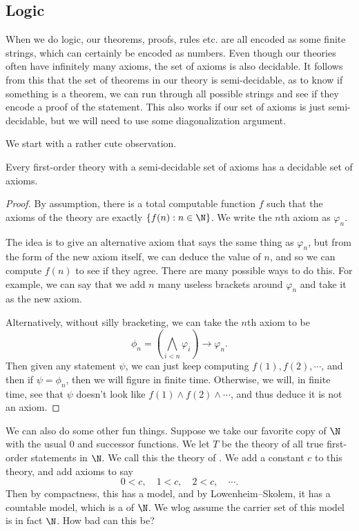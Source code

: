 \documentclass[a4paper]{article}
\begin{document}
\subsection{Logic}
When we do logic, our theorems, proofs, rules etc. are all encoded as some finite strings, which can certainly be encoded as numbers. Even though our theories often have infinitely many axioms, the set of axioms is also decidable. It follows from this that the set of theorems in our theory is semi-decidable, as to know if something is a theorem, we can run through all possible strings and see if they encode a proof of the statement. This also works if our set of axioms is just semi-decidable, but we will need to use some diagonalization argument.

We start with a rather cute observation.
\begin{thm}
  Every first-order theory with a semi-decidable set of axioms has a decidable set of axioms.
\end{thm}

\begin{proof}
  By assumption, there is a total computable function $f$ such that the axioms of the theory are exactly $\{f(n): n \in \N\}$. We write the $n$th axiom as $\varphi_n$.

  The idea is to give an alternative axiom that says the same thing as $\varphi_n$, but from the form of the new axiom itself, we can deduce the value of $n$, and so we can compute $f(n)$ to see if they agree. There are many possible ways to do this. For example, we can say that we add $n$ many useless brackets around $\varphi_n$ and take it as the new axiom.

  Alternatively, without silly bracketing, we can take the $n$th axiom to be
  \[
    \phi_n = \left(\bigwedge_{i < n} \varphi_i\right) \to \varphi_n.
  \]
  Then given any statement $\psi$, we can just keep computing $f(1), f(2), \cdots$, and then if $\psi = \phi_n$, then we will figure in finite time. Otherwise, we will, in finite time, see that $\psi$ doesn't look like $f(1) \wedge f(2) \wedge \cdots $, and thus deduce it is not an axiom.
\end{proof}

We can also do some other fun things. Suppose we take our favorite copy of $\N$ with the usual $0$ and successor functions. We let $T$ be the theory of all true first-order statements in $\N$. We call this the theory of . We add a constant $c$ to this theory, and add axioms to say
\[
  0 < c,\quad 1 < c, \quad 2 < c, \quad \cdots.
\]
Then by compactness, this has a model, and by Lowenheim--Skolem, it has a countable model, which is a  of $\N$. We wlog assume the carrier set of this model is in fact $\N$. How bad can this be?
\end{document}
